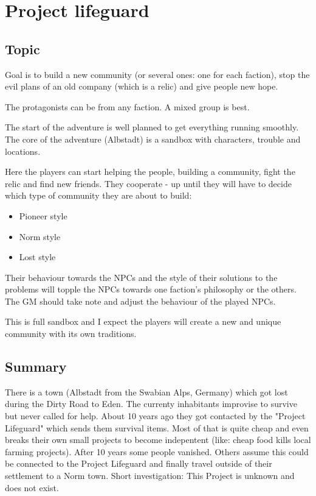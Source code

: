 \chapter{Project lifeguard}
\label{ch:project lifeguard}

\section{Topic}

Goal is to build a new community (or several ones: one for each faction), stop the evil plans of an old company (which is a relic) and give people new hope.

The protagonists can be from any faction. A mixed group is best.

The start of the adventure is well planned to get everything running smoothly. The core of the adventure (Albstadt) is a sandbox with characters, trouble and locations.

Here the players can start helping the people, building a community, fight the relic and find new friends. They cooperate - up until they will have to decide which type of community they are about to build:

\begin{itemize}
    \item Pioneer style
    \item Norm style
    \item Lost style
\end{itemize}

Their behaviour towards the NPCs and the style of their solutions to the problems will topple the NPCs towards one faction's philosophy or the others. The GM should take note and adjust the behaviour of the played NPCs.

This is full sandbox and I expect the players will create a new and unique community with its own traditions.

\section{Summary}

There is a town (Albstadt from the Swabian Alps, Germany) which got lost during the Dirty Road to Eden. The currenty inhabitants improvise to survive but never called for help. About 10 years ago they got contacted by the "Project Lifeguard" which sends them survival items. Most of that is quite cheap and even breaks their own small projects to become indepentent (like: cheap food kills local farming projects). After 10 years some people vanished. Others assume this could be connected to the Project Lifeguard and finally travel outside of their settlement to a Norm town. Short investigation: This Project is unknown and does not exist.


